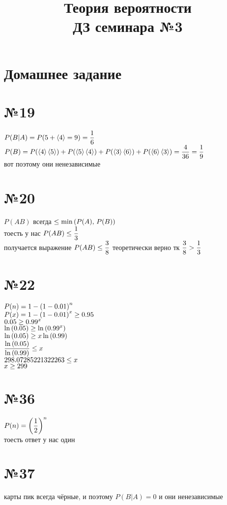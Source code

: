 \documentclass{article}
\title{Теория вероятности \\ ДЗ семинара №3}
\newcommand{\hr}{\par\vspace{.5\baselineskip}\noindent\hrulefill\par}
\newcommand{\dice}[1]{\langle#1\rangle}
\begin{document}
  \maketitle

  \hr
  \section*{Домашнее задание}
  \section*{№19}
  $\ds P(B|A) = P(5 + \dice{4} = 9) = \f{1}{6} $ \\
  $\ds P(B) = P(\dice{4}\,\dice{5}) + P(\dice{5}\,\dice{4}) + P(\dice{3}\,\dice{6}) + P(\dice{6}\,\dice{3})
  = \f{4}{36} = \f{1}{9} $ \\
  вот поэтому они ненезависимые

  \section*{№20}
  $P(AB)$ всегда $\leq \min\left(P(A),\, P(B)\right)$ \\
  тоесть у нас $\displaystyle P(AB) \leq \frac{1}{3}$ \\
  получается выражение $\displaystyle P(AB) \leq \frac{3}{8}$ теоретически верно тк $\displaystyle \frac{3}{8} > \frac{1}{3}$

  \section*{№22}
  $\displaystyle P(n) = 1-\left(1-0.01\right)^n$ \\
  $\displaystyle P(x) = 1-\left(1-0.01\right)^x \geq 0.95$ \\
  $\displaystyle 0.05 \geq 0.99^x $ \\
  $\displaystyle \ln\left(0.05\right) \geq \ln\left(0.99^x\right) $ \\
  $\displaystyle \ln\left(0.05\right) \geq x\ln\left(0.99\right) $ \\
  $\displaystyle \frac{\ln\left(0.05\right)}{\ln\left(0.99\right)} \leq x $ \\
  $\displaystyle 298.07285221322263 \leq x $ \\
  $\displaystyle x \geq 299 $

  \section*{№36}
  $\displaystyle P(n) = \left(\frac{1}{2}\right)^n$ \\
  тоесть ответ у нас один

  \section*{№37}
  карты пик всегда чёрные, и поэтому $P(B|A) = 0$ и они ненезависимые
\end{document}
